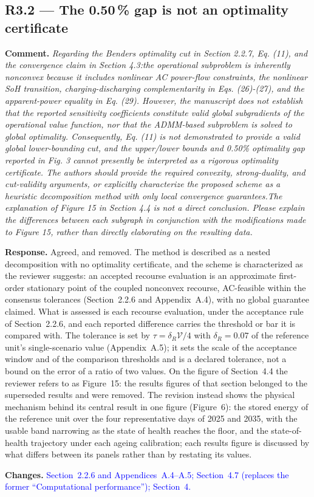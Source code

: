 \documentclass[11pt]{article}
\newcommand{\rcomment}[1]{\par\medskip\noindent\textbf{Comment.} \textit{#1}\par\smallskip}
\newcommand{\rresponse}[1]{\noindent\textbf{Response.} #1\par\smallskip}
\newcommand{\rchanges}[1]{\noindent\textbf{Changes.} \textcolor{blue}{#1}\par\medskip}
\begin{document}
\subsection*{R3.2 --- The 0.50\,\% gap is not an optimality certificate}
\rcomment{
Regarding the Benders optimality cut in Section 2.2.7, Eq. (11), and the convergence claim in Section 4.3:the operational subproblem is inherently nonconvex because it includes nonlinear AC power-flow constraints, the nonlinear SoH transition, charging-discharging complementarity in Eqs. (26)-(27), and the apparent-power equality in Eq. (29). However, the manuscript does not establish that the reported sensitivity coefficients constitute valid global subgradients of the operational value function, nor that the ADMM-based subproblem is solved to global optimality. Consequently, Eq. (11) is not demonstrated to provide a valid global lower-bounding cut, and the upper/lower bounds and 0.50\% optimality gap reported in Fig. 3 cannot presently be interpreted as a rigorous optimality certificate. The authors should provide the required convexity, strong-duality, and cut-validity arguments, or explicitly characterize the proposed scheme as a heuristic decomposition method with only local convergence guarantees.The explanation of Figure 15 in Section 4.4 is not a direct conclusion. Please explain the differences between each subgraph in conjunction with the modifications made to Figure 15, rather than directly elaborating on the resulting data.
}
\rresponse{Agreed, and removed. The method is described as a nested decomposition with no optimality
certificate, and the scheme is characterized as the reviewer suggests: an accepted recourse evaluation is an approximate first-order stationary point of the coupled nonconvex recourse, AC-feasible within the consensus tolerances (Section~2.2.6 and Appendix~A.4), with no global guarantee claimed. What is assessed is each recourse evaluation, under the acceptance rule of Section~2.2.6, and each reported difference carries the
threshold or bar it is compared with. The tolerance is set by
$\tau = \delta_R \mathcal{V}/4$ with $\delta_R = 0.07$ of the reference unit's single-scenario value (Appendix~A.5); it sets the scale of the acceptance window and of the comparison thresholds and is a declared tolerance, not a bound on the error of a ratio
of two values. On the figure of Section~4.4 the reviewer refers to as Figure~15: the results figures of that section
belonged to the superseded results and were removed. The revision instead shows the physical mechanism behind its central result in one figure (Figure~6): the stored energy of the reference unit over the four representative days of 2025 and 2035, with the usable band narrowing as the state of health reaches the floor, and the state-of-health trajectory under each ageing calibration; each results figure is discussed by what differs between its panels rather than by restating its values.}
\rchanges{Section~2.2.6 and Appendices~A.4--A.5; Section~4.7 (replaces the former ``Computational performance''); Section~4.}
\end{document}
